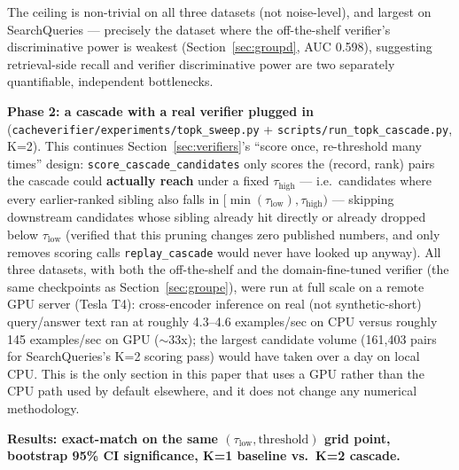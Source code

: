 \documentclass[11pt]{article}
\newcommand{\taulow}{\ensuremath{\tau_{\text{low}}}}
\newcommand{\tauhigh}{\ensuremath{\tau_{\text{high}}}}
\begin{document}
The ceiling is non-trivial on all three datasets (not noise-level), and largest on SearchQueries --- precisely the dataset where the off-the-shelf verifier's discriminative power is weakest (Section~\ref{sec:groupd}, AUC 0.598), suggesting retrieval-side recall and verifier discriminative power are two separately quantifiable, independent bottlenecks.

\textbf{Phase 2: a cascade with a real verifier plugged in} (\texttt{cacheverifier/\allowbreak{}experiments/\allowbreak{}topk\_\allowbreak{}sweep.\allowbreak{}py} + \texttt{scripts/\allowbreak{}run\_\allowbreak{}topk\_\allowbreak{}cascade.\allowbreak{}py}, K=2). This continues Section~\ref{sec:verifiers}'s ``score once, re-threshold many times'' design: \texttt{score\_\allowbreak{}cascade\_\allowbreak{}candidates} only scores the (record, rank) pairs the cascade could \textbf{actually reach} under a fixed $\tauhigh$ --- i.e.\ candidates where every earlier-ranked sibling also falls in $[\min(\taulow), \tauhigh)$ --- skipping downstream candidates whose sibling already hit directly or already dropped below $\taulow$ (verified that this pruning changes zero published numbers, and only removes scoring calls \texttt{replay\_\allowbreak{}cascade} would never have looked up anyway). All three datasets, with both the off-the-shelf and the domain-fine-tuned verifier (the same checkpoints as Section~\ref{sec:groupe}), were run at full scale on a remote GPU server (Tesla T4): cross-encoder inference on real (not synthetic-short) query/answer text ran at roughly 4.3--4.6 examples/sec on CPU versus roughly 145 examples/sec on GPU ($\sim$33x); the largest candidate volume (161{,}403 pairs for SearchQueries's K=2 scoring pass) would have taken over a day on local CPU. This is the only section in this paper that uses a GPU rather than the CPU path used by default elsewhere, and it does not change any numerical methodology.

\textbf{Results: exact-match on the same $(\taulow, \text{threshold})$ grid point, bootstrap 95\% CI significance, K=1 baseline vs.\ K=2 cascade.}
\end{document}
